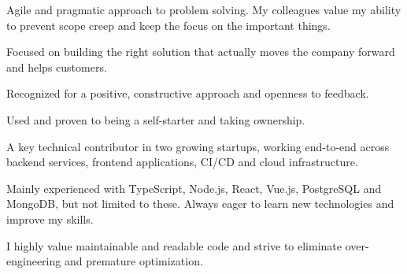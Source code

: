\documentclass[8pt]{developercv} %
\begin{document}


\begin{minipage}[t]{0.45\textwidth} %
	\vspace{-\baselineskip} %

	Agile and pragmatic approach to problem solving. My colleagues value my ability to prevent scope creep and keep the focus on the important things.

	Focused on building the right solution that actually moves the company forward and helps customers.

	Recognized for a positive, constructive approach and openness to feedback.

	Used and proven to being a self-starter and taking ownership.

\end{minipage}
\hfill %
\begin{minipage}[t]{0.45\textwidth} %
	\vspace{-\baselineskip} %

	A key technical contributor in two growing startups, working end-to-end across backend services, frontend applications, CI/CD and cloud infrastructure.

	Mainly experienced with TypeScript, Node.js, React, Vue.js, PostgreSQL and MongoDB, but not limited to these. Always eager to learn new technologies and improve my skills.

	I highly value maintainable and readable code and strive to eliminate over-engineering and premature optimization.
\end{minipage}



\end{document}
